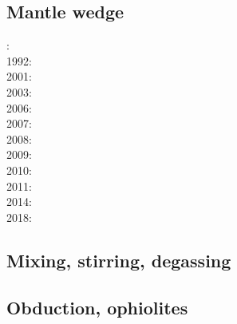 \subsection{Mantle wedge} 

{\scriptsize
{}: \cite{tosl78}\\
1992: \cite{dast92}\\
2001: \cite{bigu01}\cite{haki01}\\
2003: \cite{vank03}\\
2006: \cite{gogc06}\cite{gecy06}\\
2007: \cite{gogc07}\cite{knvk07}\cite{lohd07}\\
2008: \cite{knva08}\cite{cage08}\\
2009: \cite{leki09}\cite{heaa09}\\
2010: \cite{roms10}\cite{hogz10}\\
2011: \cite{zhgh11}\\
2014: \cite{ledg14}\cite{mabv14}\\
2018: \cite{pltv18}
}

\subsection{Mixing, stirring, degassing} 

{\scriptsize
\noindent
\cite{olyb84}
\cite{ketu90}
\cite{pelt96}
\cite{cori99}
\cite{huke01}
\cite{vahb02}
\cite{fasa03}
\cite{colt05}
\cite{gogc07}\cite{nake07}\cite{vabh07}
\cite{lemj11}\cite{saad11}
\cite{onzh18}
}

\subsection{Obduction, ophiolites}
 

